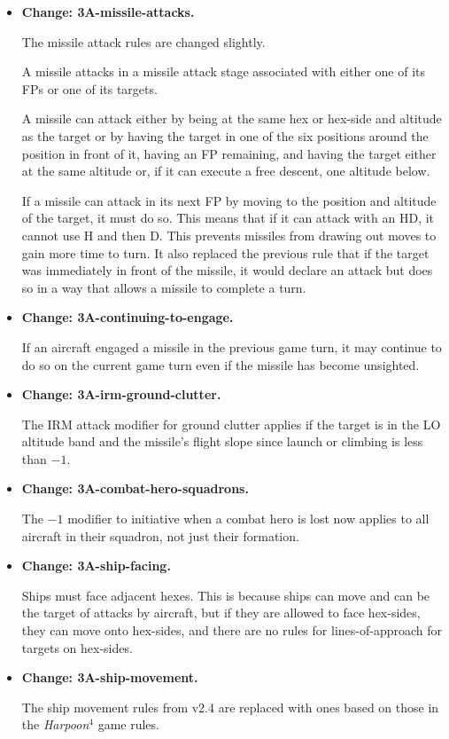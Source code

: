 \documentclass[10pt]{report}
\newcommand{\itemtag}[1]{\item \textbf{Change: #1.}\par}
\begin{document}
\begin{itemize}
    \itemtag{3A-missile-attacks} The missile attack rules are changed slightly. 
    
    A missile attacks in a missile attack stage associated with either one of its FPs or one of its targets. 
    
    A missile can attack either by being at the same hex or hex-side and altitude as the target or by having the target in one of the six positions around the position in front of it, having an FP remaining, and having the target either at the same altitude or, if it can execute a free descent, one altitude below.

    If a missile can attack in its next FP by moving to the position and altitude of the target, it must do so. This means that if it can attack with an HD, it cannot use H and then D. This prevents missiles from drawing out moves to gain more time to turn. It also replaced the previous rule that if the target was immediately in front of the missile, it would declare an attack but does so in a way that allows a missile to complete a turn.

    \itemtag{3A-continuing-to-engage} If an aircraft engaged a missile in the previous game turn, it may continue to do so on the current game turn even if the missile has become unsighted.
    
    \itemtag{3A-irm-ground-clutter} The IRM attack modifier for ground clutter applies if the target is in the LO altitude band and the missile's flight slope since launch or climbing is less than $-1$.
    
    \itemtag{3A-combat-hero-squadrons} The $-1$ modifier to initiative when a combat hero is lost now applies to all aircraft in their squadron, not just their formation.
    
    \itemtag{3A-ship-facing} Ships must face adjacent hexes. This is because ships can move and can be the target of attacks by aircraft, but if they are allowed to face hex-sides, they can move onto hex-sides, and there are no rules for lines-of-approach for targets on hex-sides.
    
    \itemtag{3A-ship-movement} The ship movement rules from v2.4 are replaced with ones based on those in the \emph{Harpoon$^4$} game rules.


       
    
    

\end{itemize}
\end{document}
